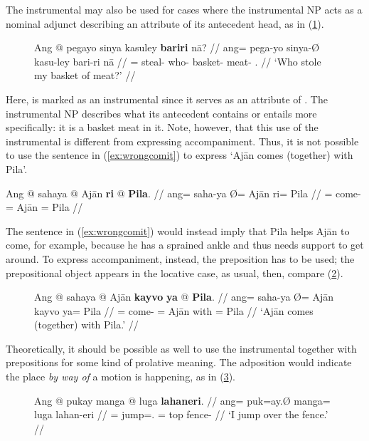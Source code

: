 The instrumental may also be used for cases where the instrumental NP acts as a
nominal adjunct describing an attribute of its antecedent head, as in
(\ref{ex:nounadjc}).

\begin{figure}[h]
\ex\label{ex:nounadjc}
\begingl
	\gla Ang @ pegayo sinya kasuley \textbf{bariri} nā? //
	\glb ang= pega-yo sinya-Ø kasu-ley bari-ri nā //
	\glc \AgtT{}= steal-\TsgN{} who-\Top{} basket-\PargI{} 
		meat-\Ins{} \Fsg{}.\Gen{} //
	\glft `Who stole my basket of meat?' //
\endgl\xe
\end{figure}

Here,  is marked as an instrumental since it serves as an
attribute of . The instrumental NP describes what its
antecedent contains or entails more specifically: it is a basket  meat
in it. Note, however, that this use of the instrumental is different from
expressing accompaniment. Thus, it is not possible to use the sentence in
(\ref{ex:wrongcomit}) to express `Ajān comes (together) with Pila'.

\ex\label{ex:wrongcomit}\ljudge* \begingl
	\gla Ang @ sahaya {} @ Ajān \textbf{ri} @ \textbf{Pila}. //
	\glb ang= saha-ya Ø= Ajān ri= Pila //
	\glc \AgtT{}= come-\TsgM{} \Top{}= Ajān \Ins{}= Pila //
\endgl\xe

The sentence in (\ref{ex:wrongcomit}) would instead imply that Pila helps Ajān
to come, for example, because he has a sprained ankle and thus needs support to
get around. To express accompaniment, instead, the preposition
 has to be used; the prepositional
object appears in the locative case, as usual, then, compare
(\ref{ex:comitwith}).

\begin{figure}[h]
\ex\label{ex:comitwith}%
\begingl
	\gla Ang @ sahaya {} @ Ajān \textbf{kayvo} \textbf{ya} @ \textbf{Pila}. //
	\glb ang= saha-ya Ø= Ajān kayvo ya= Pila //
	\glc \AgtT{}= come-\TsgM{} \Top{}= Ajān with \Loc{}= Pila //
	\glft `Ajān comes (together) with Pila.' //
\endgl\xe
\end{figure}

Theoretically, it should be possible as well to use the instrumental together
with prepositions for some kind of prolative meaning. The adposition would
indicate the place \emph{by way of} a motion is happening, as in
(\ref{ex:viains}).

\begin{figure}[h]
\ex\label{ex:viains}
\begingl
	\gla Ang @ pukay manga @ luga \textbf{lahaneri}. //
	\glb ang= puk=ay.Ø manga= luga lahan-eri //
	\glc \AgtT{}= jump=\Fsg{}.\Top{} \Dir{}= top fence-\Ins{} //
	\glft `I jump over the fence.' //
\endgl\xe
\end{figure}

